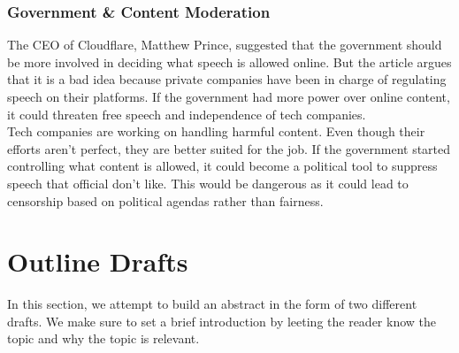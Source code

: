 \documentclass[a4paper]{article}
\begin{document}
\subsubsection{Government \& Content Moderation}
The CEO of Cloudflare, Matthew Prince, suggested that the government should be more involved in deciding what speech
is allowed online. But the article argues that it is a bad idea because private companies have been in charge of 
regulating speech on their platforms. If the government had more power over online content, it could threaten free
speech and independence of tech companies. \\

\noindent Tech companies are working on handling harmful content. Even though their efforts aren't perfect, they are
better suited for the job. If the government started controlling what content is allowed, it could become a political
tool to suppress speech that official don't like. This would be dangerous as it could lead to censorship based on
political agendas rather than fairness.

\newpage

\section{Outline Drafts}
In this section, we attempt to build an abstract in the form of two different drafts. We make sure to set a brief 
introduction by leeting the reader know the topic and why the topic is relevant. 
\end{document}
